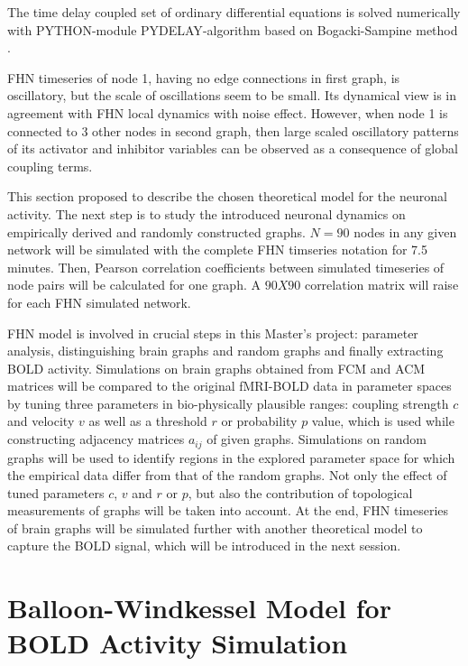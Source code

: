 The time delay coupled set of ordinary differential equations is solved numerically with \textsc{PYTHON}-module \textsc{PYDELAY}-algorithm based on Bogacki-Sampine method \citep{FLU09a, BOG89}. 


FHN timeseries of node 1, having no edge connections in first graph, is oscillatory, but the scale of oscillations seem to be small. Its dynamical view is in agreement with FHN local dynamics with noise effect. However, when node 1 is connected to 3 other nodes in second graph, then large scaled oscillatory patterns of its activator and inhibitor variables can be observed as a consequence of global coupling terms. 

This section proposed to describe the chosen theoretical model for the neuronal activity. The next step is to study the introduced neuronal dynamics on empirically derived and randomly constructed graphs. $N=90$ nodes  in any given network will be simulated with the complete FHN timseries notation for 7.5 minutes. Then, Pearson correlation coefficients between simulated timeseries of node pairs will be calculated for one graph. A $90X90$ correlation matrix will raise for each FHN simulated network.

FHN model is involved in crucial steps in this Master's project: parameter analysis, distinguishing brain graphs and random graphs and finally extracting BOLD activity. Simulations on brain graphs obtained from FCM and ACM matrices will be compared to the original fMRI-BOLD data in parameter spaces by tuning three parameters in bio-physically plausible ranges: coupling strength $c$ and velocity $v$ as well as a threshold $r$ or probability $p$ value, which is used while constructing adjacency matrices $a_{ij}$ of given graphs. Simulations on random graphs will be used to identify regions in the explored parameter space for which the empirical data differ from that of the random graphs. Not only the effect of tuned parameters $c$, $v$ and $r$ or $p$, but also the contribution of topological measurements of graphs will be taken into account. At the end, FHN timeseries of brain graphs will be simulated further with another theoretical model to capture the BOLD signal, which will be introduced in the next session.   



\section{Balloon-Windkessel Model for BOLD Activity Simulation} 

